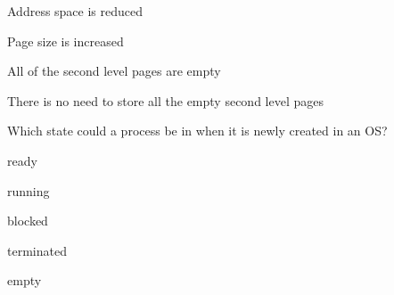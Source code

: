 \begin{questions}
\begin{verticalchoices}
\item Address space is reduced
\item Page size is increased
\item All of the second level pages are empty
\item There is no need to store all the empty second level pages
\end{verticalchoices}
\question Which state could a process be in when it is newly created in an OS?
\begin{verticalchoices}
\item ready
\item running
\item blocked
\item terminated
\item empty
\end{verticalchoices}
\end{questions}\vfill\newpage

